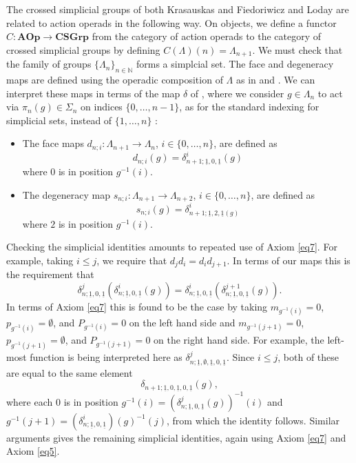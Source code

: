 \begin{rem}\label{rem:crossed}
The crossed simplicial groups of both Krasauskas \cite{Kra87} and Fiedoriwicz and Loday \cite{FL91} are related to action operads in the following way. 
On objects, we define a functor $C \colon \mathbf{AOp} \rightarrow \mathbf{CSGrp}$ from the category of action operads to the category of crossed simplicial groups by defining $C(\Lambda)(n) = \Lambda_{n+1}$. We must check that the family of groups $\{\Lambda_n\}_{n \in \mathbb{N}}$ forms a simplcial set. The face and degeneracy maps are defined using the operadic composition of $\Lambda$ as in \cite[Construction~1.1]{Kra96} and \cite[Section~2]{ber-simplicial}. We can interpret these maps in terms of the map $\delta$ of , where we consider $g \in \Lambda_n$ to act via $\pi_n(g) \in \Sigma_n$ on indices $\{0,\ldots,n-1\}$, as for the standard indexing for simplicial sets, instead of $\{1,\ldots,n\}$ :
    \begin{itemize}
        \item The face maps $d_{n;i} \colon \Lambda_{n+1} \rightarrow \Lambda_n$, $i \in \{0,\ldots,n\}$, are defined as
            \[
                d_{n;i}(g) = \delta^i_{n+1;\underline{1},0,\underline{1}}(g)
            \]
        where $0$ is in position $g^{-1}(i)$.
        \item The degeneracy map $s_{n;i} \colon \Lambda_{n+1} \rightarrow \Lambda_{n+2}$, $i \in \{0,\ldots,n\}$, are defined as
            \[
                s_{n;i}(g) = \delta^i_{n+1;\underline{1},2,\underline{1}(g)}
            \]
        where $2$ is in position $g^{-1}(i)$.
    \end{itemize}
Checking the simplicial identities amounts to repeated use of Axiom \eqref{eq7}. For example, taking $i \leq j$, we require that $d_jd_i = d_id_{j+1}$. In terms of our maps this is the requirement that
    \[
        \delta^j_{n;\underline{1},0,\underline{1}}(\delta^i_{n;\underline{1},0,\underline{1}}(g)) = \delta^i_{n;\underline{1},0,\underline{1}}(\delta^{j+1}_{n;\underline{1},0,\underline{1}}(g)).
    \]
In terms of Axiom \eqref{eq7} this is found to be the case by taking $m_{g^{-1}(i)}=0$, $p_{g^{-1}(i)} = \emptyset$, and $P_{g^{-1}(i)}=0$ on the left hand side and $m_{{g^{-1}(j+1)}} = 0$, $p_{g^{-1}(j+1)} = \emptyset$, and $P_{g^{-1}(j+1)}=0$ on the right hand side. For example, the left-most function is being interpreted here as $\delta^j_{n;\underline{1},\emptyset,\underline{1},0,\underline{1}}$. Since $i \leq j$, both of these are equal to the same element
    \[
        \delta_{n+1;\underline{1},0,\underline{1},0,\underline{1}}(g),
    \]
where each $0$ is in position $g^{-1}(i) = (\delta_{n;\underline{1},0,\underline{1}}^j(g))^{-1}(i)$ and $g^{-1}(j+1) = (\delta_{n;\underline{1},0,\underline{1}}^{i})(g)^{-1}(j)$, from which the identity follows. Similar arguments gives the remaining simplicial identities, again using Axiom \eqref{eq7} and Axiom \eqref{eq5}.


\end{rem}
